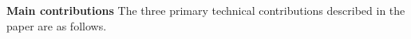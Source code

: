\documentclass{egpubl}
\renewcommand{\paragraph}[1]{\noindent \textbf{#1}}
\begin{document}

\paragraph{Main contributions} The three primary technical contributions described in the paper are as follows.
\end{document}
